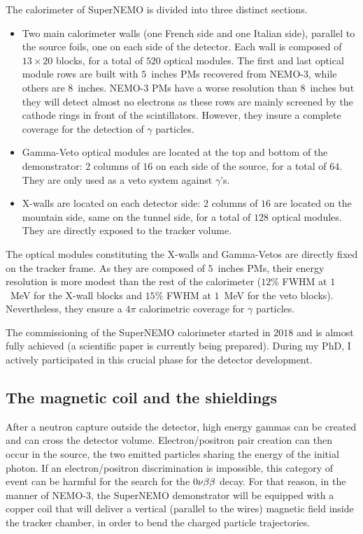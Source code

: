 The calorimeter of SuperNEMO is divided into three distinct sections.
\begin{itemize}
\item Two main calorimeter walls (one French side and one Italian side), parallel to the source foils, one on each side of the detector.
  Each wall is composed of $13\times20$ blocks, for a total of $520$ optical modules.
  The first and last optical module rows are built with $5$~inches PMs recovered from NEMO-$3$, while others are $8$~inches.
  NEMO-$3$ PMs have a worse resolution than $8$~inches but they will detect almost no electrons as these rows are mainly screened by the cathode rings in front of the scintillators.
  However, they insure a complete coverage for the detection of $\gamma$ particles.
\item Gamma-Veto optical modules are located at the top and bottom of the demonstrator: $2$ columns of $16$ on each side of the source, for a total of $64$.
  They are only used as a veto system against $\gamma$'s.
\item X-walls are located on each detector side: $2$ columns of $16$ are located on the mountain side, same on the tunnel side, for a total of $128$ optical modules.
  They are directly exposed to the tracker volume.
\end{itemize}
The optical modules constituting the X-walls and Gamma-Vetos are directly fixed on the tracker frame.
As they are composed of $5$~inches PMs, their energy resolution is more modest than the rest of the calorimeter ($12$\% FWHM at $1$~MeV for the X-wall blocks and $15$\% FWHM at $1$~MeV for the veto blocks).
Nevertheless, they ensure a $4\pi$ calorimetric coverage for $\gamma$ particles.

The commissioning of the SuperNEMO calorimeter started in $2018$ and is almost fully achieved (a scientific paper is currently being prepared).
During my PhD, I actively participated in this crucial phase for the detector development.


\subsection{The magnetic coil and the shieldings}
\label{subsec:magnetic_field}

After a neutron capture outside the detector, high energy gammas can be created and can cross the detector volume.
Electron/positron pair creation can then occur in the source, the two emitted particles sharing the energy of the initial photon.
If an electron/positron discrimination is impossible, this category of event can be harmful for the search for the $0\nu\beta\beta$ decay.
For that reason, in the manner of NEMO-$3$, the SuperNEMO demonstrator will be equipped with a copper coil that will deliver a vertical (parallel to the wires) magnetic field inside the tracker chamber, in order to bend the charged particle trajectories.


